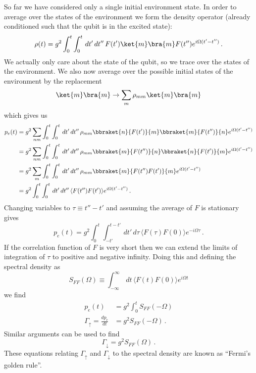 So far we have considered only a single initial environment state.
In order to average over the states of the environment we form the density operator (already conditioned such that the qubit is in the excited state):
\begin{equation}
\rho(t) = g^2 \int_0^t \int_0^t \, dt' \, dt'' \, F(t')\ket{m}\bra{m}F(t'') e^{i \Omega (t'-t'')} \, .
\end{equation}
We actually only care about the state of the qubit, so we trace over the states of the environment.
We also now average over the possible initial states of the environment by the replacement
\begin{displaymath}
\ket{m}\bra{m} \rightarrow \sum_m \rho_{mm} \ket{m}\bra{m}
\end{displaymath}
which gives us
\begin{align}
p_e(t)
  &= g^2 \sum_{nm} \int_0^t \int_0^t \, dt' \, dt'' \, \rho_{mm} \bbraket{n}{F(t')}{m} \bbraket{m}{F(t'')}{n} e^{i \Omega (t' - t'')} \nonumber \\
  &= g^2 \sum_{nm} \int_0^t \int_0^t \, dt' \, dt'' \, \rho_{mm} \bbraket{m}{F(t'')}{n} \bbraket{n}{F(t')}{m} e^{i \Omega (t' - t'')} \nonumber \\
  &= g^2 \sum_m \int_0^t \int_0^t \, dt' \, dt'' \, \rho_{mm} \bbraket{m}{F(t'') F(t')}{m} e^{i \Omega (t' - t'')} \nonumber \\
  &= g^2 \int_0^t \int_0^t \, dt' \, dt'' \, \langle F(t'') F(t') \rangle e^{i \Omega (t' - t'')}
  \, .
\end{align}
Changing variables to $\tau \equiv t'' - t'$ and assuming the average of $F$ is stationary gives
\begin{equation}
p_e(t)
= g^2 \int_0^t \int_{-t'}^{t-t'} \, dt' \, d\tau \, \langle F(\tau) F(0) \rangle e^{-i \Omega \tau} \, .
\end{equation}
If the correlation function of $F$ is very short then we can extend the limits of integration of $\tau$ to positive and negative infinity.
Doing this and defining the spectral density as
\begin{equation}
S_{FF}(\Omega) \equiv \int_{-\infty}^\infty \, dt \, \langle F(t) F(0) \rangle e^{i \Omega t}
\end{equation}
we find
\begin{align}
p_e(t) 
&= g^2 \int_0^t S_{FF}(-\Omega) \\
\Gamma_{\uparrow} = \frac{dp_e}{dt} &= g^2 S_{FF}(-\Omega) \, .
\end{align}
Similar arguments can be used to find
\begin{equation}
  \Gamma_\downarrow
  = g^2 S_{FF}(\Omega) \, . \label{eq:ch.decoherence.sec.noise_from_a_quantum_environment:gamma_down}
\end{equation}
These equations relating $\Gamma_\uparrow$ and $\Gamma_\downarrow$ to the spectral density are known as ``Fermi's golden rule''.
